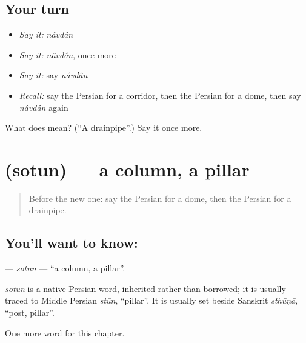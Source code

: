 \subsection*{Your turn}
\begin{itemize}
\raggedright
  \item \emph{Say it:} \emph{nâvdân}
  \item \emph{Say it:} \emph{nâvdân}, once more
  \item \emph{Say it:} say \emph{nâvdân}
  \item \emph{Recall:} say the Persian for a corridor, then the Persian for a dome, then say \emph{nâvdân} again
\end{itemize}

\begin{tcolorbox}[breakable,colback=teal!4,colframe=teal!35!black,title={Before you move on}]
What does  mean? (\textquotedblleft{}A drainpipe\textquotedblright{}.) Say it once more.
\end{tcolorbox}
\section[\texorpdfstring{\fa{ستون} (sotun)}{ستون (sotun)}]{ (sotun) — a column, a pillar}

\label{lesson:FA-C196-sotun}



\begin{quote}
Before the new one: say the Persian for a dome, then the Persian for a drainpipe.
\end{quote}

\subsection*{You'll want to know: }
\textbf{} — \emph{sotun} — \textquotedblleft{}a column, a pillar\textquotedblright{}.

\begin{cousinweb}
\emph{sotun} is a native Persian word, inherited rather than borrowed; it is usually traced to Middle Persian \emph{stūn}, \textquotedblleft{}pillar\textquotedblright{}. It is usually set beside Sanskrit \emph{sthūṇā}, \textquotedblleft{}post, pillar\textquotedblright{}.
\end{cousinweb}

\begin{grammarlens}[title={What you've built}]
One more word for this chapter.
\end{grammarlens}

